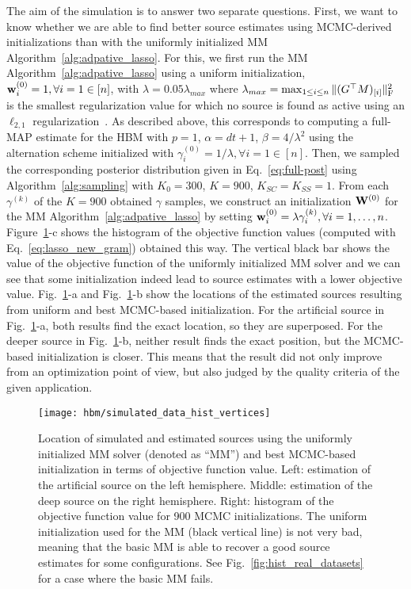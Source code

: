 The aim of the simulation is to answer two separate questions. First, we want to know whether we are able to find better source estimates using MCMC-derived initializations than with the uniformly initialized MM Algorithm~\ref{alg:adpative_lasso}.
For this, we first run the MM Algorithm~\ref{alg:adpative_lasso} using a uniform initialization, \ie $\mathbf{w}^{(0)}_{i} = 1, \forall i=1\in [n]$, with $\lambda = 0.05\lambda_{max}$ where $\lambda_{max}= \max_{1 \leq i \leq n} \|{(G^\top M)_{[i]}}\|_{\rm F}^2$ is the smallest regularization value for which no source is found as active using an $\ell_{2,1}$ regularization~\cite{Ndiaye_Fercoq_Gramfort_Salmon15,strohmeier-etal:16}. As described above, this corresponds to computing a full-MAP estimate for the HBM with $p=1$, $\alpha = dt +1 $, $\beta = 4/\lambda^2$ using the alternation scheme \label{eq:AO-nu0-X} initialized with $\gamma^{(0)}_i = 1/\lambda, \forall i=1\in [n]$.
Then, we sampled the corresponding posterior distribution given in Eq.~\ref{eq:full-post} using Algorithm~\ref{alg:sampling} with $K_0 = 300$, $K = 900$, $K_{SC} = K_{SS} = 1$. From each $\gamma^{(k)}$ of the $K = 900$ obtained $\gamma$ samples, we construct an initialization $\mathbf{W}^{(0)}$ for the MM Algorithm~\ref{alg:adpative_lasso} by setting $\mathbf{w}^{(0)}_{i} = \lambda \gamma_i^{(k)}, \forall i=1,\dots,n$. Figure~\ref{fig:simu_MM_best_MCMC}-c shows the histogram of the objective function values (computed with Eq.~\ref{eq:lasso_new_gram}) obtained this way. The vertical black bar shows the value of the objective function of the uniformly initialized MM solver and we can see that some initialization indeed lead to source estimates with a lower objective value. Fig.~\ref{fig:simu_MM_best_MCMC}-a and Fig.~\ref{fig:simu_MM_best_MCMC}-b show the locations of the estimated sources resulting from uniform and best MCMC-based initialization. For the artificial source in Fig.~\ref{fig:simu_MM_best_MCMC}-a, both results find the exact location, so they are superposed. For the deeper source in Fig.~\ref{fig:simu_MM_best_MCMC}-b, neither result finds the exact position, but the MCMC-based initialization is closer. This means that the result did not only improve from an optimization point of view, but also judged by the quality criteria of the given application.

\begin{figure}[htp]
	\centering
	\texttt{[image: hbm/simulated\_data\_hist\_vertices]}
	\caption{Location of simulated and estimated sources using the uniformly initialized MM solver (denoted as ``MM'') and best MCMC-based initialization in terms of objective function value. Left: estimation of the artificial source on the left hemisphere. Middle: estimation of the deep source on the right hemisphere. Right: histogram of the objective function value for 900 MCMC initializations. The uniform initialization used for the MM (black vertical line) is not very bad, meaning that the basic MM is able to recover a good source estimates for some configurations. See Fig.~\ref{fig:hist_real_datasets} for a case where the basic MM fails.}
	\label{fig:simu_MM_best_MCMC}
\end{figure}

